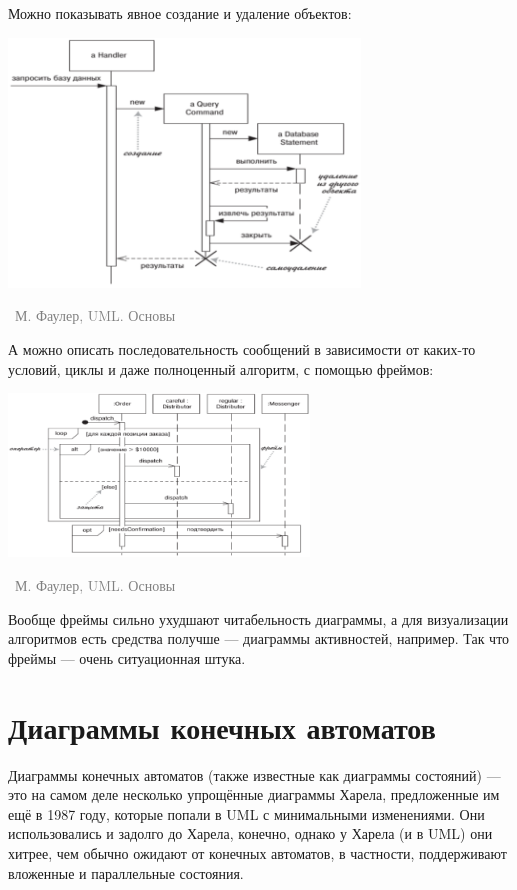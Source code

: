 \documentclass[a5paper]{article}
\newcommand{\attribution}[1] {
    \vspace{-5mm}\begin{flushright}\begin{scriptsize}\textcolor{gray}{\textcopyright\, #1}\end{scriptsize}\end{flushright}
}
\begin{document}
Можно показывать явное создание и удаление объектов:

\begin{center}
    \includegraphics[width=0.7\textwidth]{sequenceLifeCycle.png}
    \attribution{М. Фаулер, UML. Основы}
\end{center}

А можно описать последовательность сообщений в зависимости от каких-то условий, циклы и даже полноценный алгоритм, с помощью фреймов:

\begin{center}
    \includegraphics[width=0.6\textwidth]{sequenceFrames.png}
    \attribution{М. Фаулер, UML. Основы}
\end{center}

Вообще фреймы сильно ухудшают читабельность диаграммы, а для визуализации алгоритмов есть средства получше --- диаграммы активностей, например. Так что фреймы --- очень ситуационная штука.

\section{Диаграммы конечных автоматов}

Диаграммы конечных автоматов (также известные как диаграммы состояний) --- это на самом деле несколько упрощённые диаграммы Харела, предложенные им ещё в 1987 году, которые попали в UML с минимальными изменениями. Они использовались и задолго до Харела, конечно, однако у Харела (и в UML) они хитрее, чем обычно ожидают от конечных автоматов, в частности, поддерживают вложенные и параллельные состояния.
\end{document}
